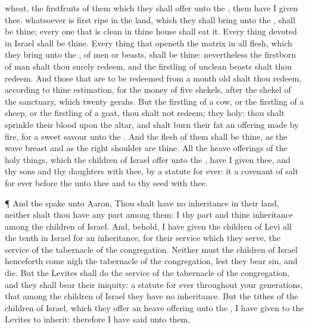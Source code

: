 {wheat, the
firstfruits of them which they shall
offer unto the
{}, them have I
given thee.
 whatsoever is first
ripe in the
land, which they shall
bring unto the
{}, shall be thine; every one that is
clean in thine
house shall
eat
{} it.
Every thing
devoted in
Israel shall be thine.
Every thing that
openeth the
matrix in all
flesh, which they
bring unto the
{},
{} of
men or
beasts, shall be thine: nevertheless the
firstborn of
man shalt thou
surely
redeem, and the
firstling of
unclean
beasts shalt thou
redeem.
And those that are to be
redeemed from a
month
old shalt thou
redeem, according to thine
estimation, for the
money of
five
shekels, after the
shekel of the
sanctuary, which
{}
twenty
gerahs.
But the
firstling of a
cow, or the
firstling of a
sheep, or the
firstling of a
goat, thou shalt not
redeem; they
{}
holy: thou shalt
sprinkle their
blood upon the
altar, and shalt
burn their
fat
{} an offering made by
fire, for a
sweet
savour unto the
{}.
And the
flesh of them shall be thine, as the
wave
breast and as the
right
shoulder are thine.
All the heave
offerings of the holy
things, which the
children of
Israel
offer unto the
{}, have I
given thee, and thy
sons and thy
daughters with thee, by a
statute for
ever: it
{} a
covenant of
salt for
ever
before the
{} unto thee and to thy
seed with thee.
\par }{\PP {}¶ And the
{}
spake unto
Aaron, Thou shalt have no
inheritance in their
land, neither shalt thou have any
part
among them: I
{} thy
part and thine
inheritance
among the
children of
Israel.
And, behold, I have
given the
children of
Levi all the
tenth in
Israel for an
inheritance,
for their
service which they
serve,
{} the
service of the
tabernacle of the
congregation.
Neither must the
children of
Israel
henceforth come
nigh the
tabernacle of the
congregation, lest they
bear
sin, and
die.
But the
Levites shall
do the
service of the
tabernacle of the
congregation, and they shall
bear their
iniquity:
{} a
statute for
ever throughout your
generations, that
among the
children of
Israel they
have no
inheritance.
But the
tithes of the
children of
Israel, which they
offer
{} an heave
offering unto the
{}, I have
given to the
Levites to
inherit: therefore I have
said unto them,
}
